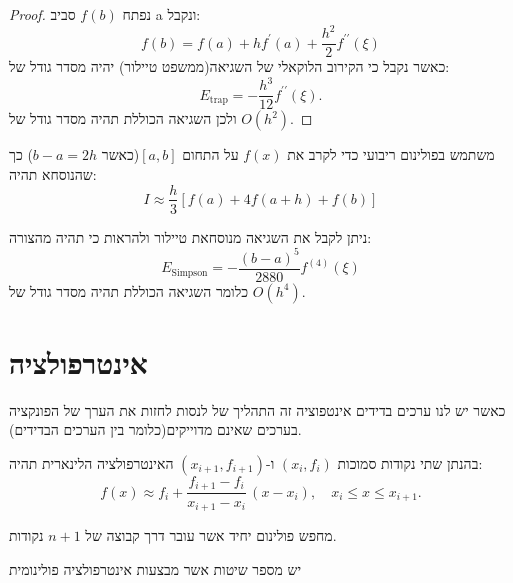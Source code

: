 \documentclass{tstextbook}
\begin{document}
\begin{proof}
נפתח \(f(b)\) סביב a ונקבל:
$$f(b)=f(a)+h f^{\prime}(a)+{\frac{h^{2}}{2}}f^{\prime\prime}(\xi)$$
כאשר נקבל כי הקירוב הלוקאלי של השגיאה(ממשפט טיילור) יהיה מסדר גודל של:
$$E_{\mathrm{trap}}=-{\frac{h^{3}}{12}}f^{\prime\prime}(\xi).$$
ולכן השגיאה הכוללת תהיה מסדר גודל של \(O(h^{2})\).

\end{proof}
\begin{proposition}
משתמש בפולינום ריבועי כדי לקרב את \(f(x)\) על התחום \([a,b]\)(כאשר \(b-a=2h\)) כך שהנוסחא תהיה:
$$I\approx\frac{h}{3}\left[f(a)+4f(a+h)+f(b)\right]$$

\end{proposition}
\begin{corollary}
ניתן לקבל את השגיאה מנוסחאת טיילור ולהראות כי תהיה מהצורה:
$$E_{\mathrm{Simpson}}=-\frac{(b-a)^{5}}{2880}f^{(4)}(\xi)$$
כלומר השגיאה הכוללת תהיה מסדר גודל של \(O(h^{4})\).

\end{corollary}
\section{אינטרפולציה}

\begin{definition}[אינטרפולציה]
כאשר יש לנו ערכים בדידים אינטפוציה זה התהליך של לנסות לחזות את הערך של הפונקציה בערכים שאינם מדוייקים(כלומר בין הערכים הבדידים).

\end{definition}
\begin{definition}
בהנתן שתי נקודות סמוכות \((x_{i},f_{i})\) ו-\((x_{i+1},f_{i+1})\) האינטרפולציה הלינארית תהיה:
$$f(x)\approx f_{i}+{\frac{f_{i+1}-f_{i}}{x_{i+1}-x_{i}}}\,(x-x_{i}),\quad x_{i}\leq x\leq x_{i+1}.$$

\end{definition}
\begin{definition}
מחפש פולינום יחיד אשר עובר דרך קבוצה של \(n+1\) נקודות.

\end{definition}
יש מספר שיטות אשר מבצעות אינטרפולציה פולינומית
\end{document}
